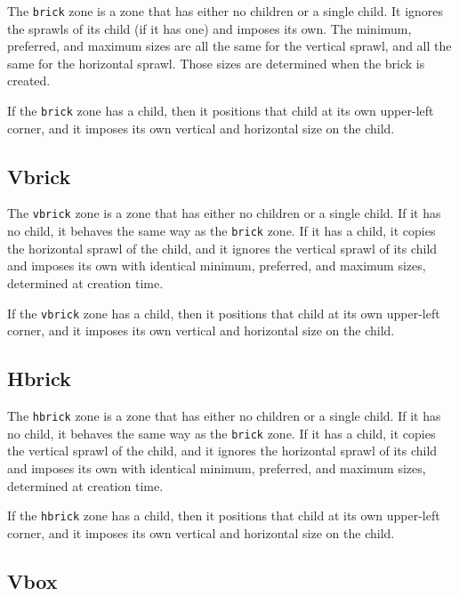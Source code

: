 \documentclass{report}
\def\code#1{\texttt{#1}}
\begin{document}
The \code{brick} zone is a zone that has either no children or a
single child.  It ignores the sprawls of its child (if it has one) and
imposes its own.  The minimum, preferred, and maximum sizes are all
the same for the vertical sprawl, and all the same for the horizontal
sprawl.  Those sizes are determined when the brick is created.

If the \code{brick} zone has a child, then it positions that child at
its own upper-left corner, and it imposes its own vertical and
horizontal size on the child.

\subsection{Vbrick}
\label{sec-zones-layout-vbrick}

The \code{vbrick} zone is a zone that has either no children or a
single child.  If it has no child, it behaves the same way as the
\code{brick} zone.   If it has a
child, it copies the horizontal sprawl of the child, and it ignores
the vertical sprawl of its child and imposes its own with identical
minimum, preferred, and maximum sizes, determined at creation time.

If the \code{vbrick} zone has a child, then it positions that child at
its own upper-left corner, and it imposes its own vertical and
horizontal size on the child.

\subsection{Hbrick}
\label{sec-zones-layout-hbrick}

The \code{hbrick} zone is a zone that has either no children or a
single child.  If it has no child, it behaves the same way as the
\code{brick} zone.   If it has a
child, it copies the vertical sprawl of the child, and it ignores
the horizontal sprawl of its child and imposes its own with identical
minimum, preferred, and maximum sizes, determined at creation time.

If the \code{hbrick} zone has a child, then it positions that child at
its own upper-left corner, and it imposes its own vertical and
horizontal size on the child.

\subsection{Vbox}
\label{sec-zones-layout-vbox}
\end{document}
